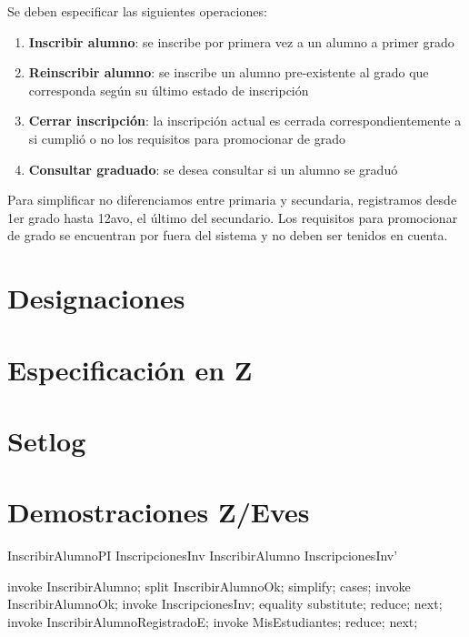 \documentclass{article}
\begin{document}
Se deben especificar las siguientes operaciones:

\begin{enumerate}
  \item \textbf{Inscribir alumno}: se inscribe por primera vez a un alumno a primer grado
  
  \item \textbf{Reinscribir alumno}: se inscribe un alumno pre-existente al grado que corresponda según su último estado de inscripción
  
  \item \textbf{Cerrar inscripción}: la inscripción actual es cerrada correspondientemente a si cumplió o no los requisitos para promocionar de grado
  
  \item \textbf{Consultar graduado}: se desea consultar si un alumno se graduó
\end{enumerate}

Para simplificar no diferenciamos entre primaria y secundaria, registramos desde 1er grado hasta 12avo, el último del secundario. Los requisitos para promocionar de grado se encuentran por fuera del sistema y no deben ser tenidos en cuenta.

\section*{Designaciones}

\section*{Especificación en Z}


\section*{Setlog}

\section*{Demostraciones Z/Eves}
\begin{theorem}{InscribirAlumnoPI}
  InscripcionesInv \land InscribirAlumno \implies InscripcionesInv'
\end{theorem}

\begin{zproof}[InscribirAlumnoPI]
  invoke InscribirAlumno;
  split InscribirAlumnoOk;
  simplify;
  cases;
  invoke InscribirAlumnoOk;
  invoke InscripcionesInv;
  equality substitute;
  reduce;
  next;
  invoke InscribirAlumnoRegistradoE;
  invoke \Xi MisEstudiantes;
  reduce;
  next;
\end{zproof}
\end{document}
